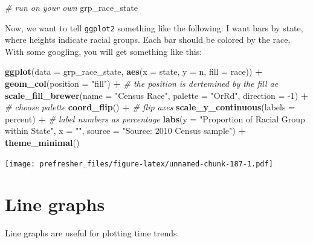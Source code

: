 \documentclass[]{book}
\newenvironment{Shaded}{\begin{snugshade}}{\end{snugshade}}
\newcommand{\CommentTok}[1]{\textcolor[rgb]{0.56,0.35,0.01}{\textit{#1}}}
\newcommand{\DataTypeTok}[1]{\textcolor[rgb]{0.13,0.29,0.53}{#1}}
\newcommand{\DecValTok}[1]{\textcolor[rgb]{0.00,0.00,0.81}{#1}}
\newcommand{\KeywordTok}[1]{\textcolor[rgb]{0.13,0.29,0.53}{\textbf{#1}}}
\newcommand{\NormalTok}[1]{#1}
\newcommand{\OperatorTok}[1]{\textcolor[rgb]{0.81,0.36,0.00}{\textbf{#1}}}
\newcommand{\StringTok}[1]{\textcolor[rgb]{0.31,0.60,0.02}{#1}}
\theoremstyle{definition}
\theoremstyle{definition}
\theoremstyle{definition}
\theoremstyle{remark}
\begin{document}
\begin{Shaded}
\begin{Highlighting}[]
\CommentTok{# run on your own}
\NormalTok{grp_race_state}
\end{Highlighting}
\end{Shaded}

Now, we want to tell \texttt{ggplot2} something like the following: I want bars by state, where heights indicate racial groups. Each bar should be colored by the race. With some googling, you will get something like this:

\begin{Shaded}
\begin{Highlighting}[]
\KeywordTok{ggplot}\NormalTok{(}\DataTypeTok{data =}\NormalTok{ grp_race_state, }\KeywordTok{aes}\NormalTok{(}\DataTypeTok{x =}\NormalTok{  state, }\DataTypeTok{y =}\NormalTok{ n,  }\DataTypeTok{fill =}\NormalTok{ race)) }\OperatorTok{+}
\StringTok{  }\KeywordTok{geom_col}\NormalTok{(}\DataTypeTok{position =} \StringTok{"fill"}\NormalTok{) }\OperatorTok{+}\StringTok{ }\CommentTok{# the position is dertemined by the fill ae}
\StringTok{  }\KeywordTok{scale_fill_brewer}\NormalTok{(}\DataTypeTok{name =} \StringTok{"Census Race"}\NormalTok{, }\DataTypeTok{palette =} \StringTok{"OrRd"}\NormalTok{, }\DataTypeTok{direction =} \DecValTok{-1}\NormalTok{) }\OperatorTok{+}\StringTok{ }\CommentTok{# choose palette}
\StringTok{  }\KeywordTok{coord_flip}\NormalTok{() }\OperatorTok{+}\StringTok{ }\CommentTok{# flip axes}
\StringTok{  }\KeywordTok{scale_y_continuous}\NormalTok{(}\DataTypeTok{labels =}\NormalTok{ percent) }\OperatorTok{+}\StringTok{ }\CommentTok{# label numbers as percentage}
\StringTok{  }\KeywordTok{labs}\NormalTok{(}\DataTypeTok{y =} \StringTok{"Proportion of Racial Group within State"}\NormalTok{,}
       \DataTypeTok{x =} \StringTok{""}\NormalTok{,}
       \DataTypeTok{source =} \StringTok{"Source: 2010 Census  sample"}\NormalTok{) }\OperatorTok{+}
\StringTok{  }\KeywordTok{theme_minimal}\NormalTok{()}
\end{Highlighting}
\end{Shaded}

\texttt{[image: prefresher\_files/figure-latex/unnamed-chunk-187-1.pdf]}

\hypertarget{line-graphs}{%
\section{Line graphs}\label{line-graphs}}

Line graphs are useful for plotting time trends.
\end{document}
